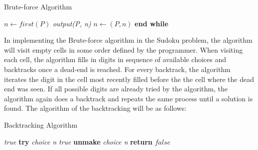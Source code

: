 \documentclass[a4paper,oneside,11pt]{report}
\newcounter{row}
\renewcommand\algorithmicdo{}
\begin{document}
\newpage
\begin{algorithm}
\caption{Brute-force Algorithm}\label{bruteforce}
\begin{algorithmic}[1]
\State $n\gets first(P)$
\textit{output(P, n)}
\EndIf
\State $n\gets (P, n)$
\EndWhile\label{bruteforceendwhile}
\State \textbf{end while}
\end{algorithmic}
\end{algorithm}

In implementing  the Brute-force algorithm in the Sudoku problem, the algorithm will visit empty cells in some order defined by the programmer. When visiting each cell, the algorithm fills in digits in sequence of available choices and backtracks once a dead-end is reached. For every backtrack, the algorithm iterates the digit in the cell most recently filled before the the cell where the dead end was seen. If all possible digits are already tried by the algorithm, the algorithm again does a backtrack and repeats the same process until a solution is found. The algorithm of the backtracking will be as follows:\\

\begin{algorithm}
\caption{Backtracking Algorithm}\label{backtracking}
\begin{algorithmic}[1]
\newcommand\NoDo{\renewcommand\algorithmicdo{}}
\textit{true}
\EndIf
{}
\State \textbf{try} \textit{choice n}
 \textit{true}
\EndIf
\State \textbf{unmake} \textit{choice n}
\EndFor
\State \textbf{return} $false$
\end{algorithmic}
\end{algorithm}

\begin{figure}[h]
  \centering
\end{figure}
\end{document}

